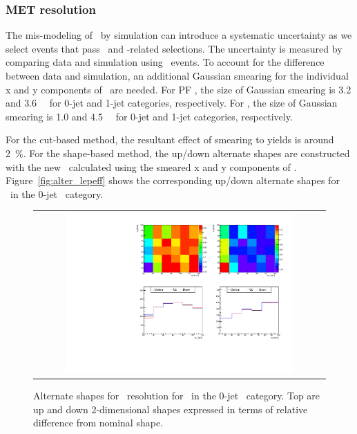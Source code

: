\subsubsection{MET resolution} 

The mis-modeling of \met\ by simulation can introduce a systematic uncertainty 
as we select events that pass \met\ and \met-related selections. 
The uncertainty is measured 
by comparing data and simulation using \dyll\ events. To account for the 
difference between data and simulation, an additional Gaussian smearing for 
the individual x and y components of \met\ are needed. 
For PF \met, the size of Gaussian smearing is 3.2 and 3.6~\GeV\ %
for 0-jet and 1-jet categories, respectively.  
For \trkmet, the size of Gaussian smearing is 1.0 and 4.5~\GeV\ %
for 0-jet and 1-jet categories, respectively.  

For the cut-based method, the resultant effect of smearing to yields is around 2~\%. 
For the shape-based method, the up/down alternate shapes are constructed 
with the new \mT\ calculated using the smeared x and y components of \met.
Figure~\ref{fig:alter_lepeff} shows the corresponding up/down alternate shapes
for \qqww\ in the 0-jet \DF\ category. 

%
\begin{figure}[htp]
\centering
\begin{tabular}{c}
\includegraphics[width=0.8\textwidth]{figures/histo_qqWW_CMS_hww_MVAMETResBounding_0j_zoom.pdf}
\end{tabular}
\caption{Alternate shapes for \met\ resolution for \qqww\ in the 0-jet \DF\ category.
         Top are up and down 2-dimensional shapes expressed in terms of relative 
         difference from nominal shape.}
\label{fig:alter_metres}
\end{figure}


